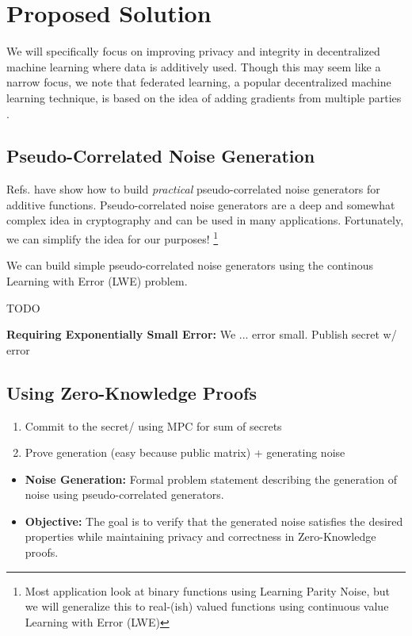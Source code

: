\documentclass[11pt]{article}
\begin{document}
\section{Proposed Solution}
We will specifically focus on improving privacy and integrity in decentralized machine learning where data is additively used.
Though this may seem like a narrow focus, we note that federated learning, a popular decentralized machine learning technique, is based on the idea of adding gradients from multiple parties .

\subsection{Pseudo-Correlated Noise Generation}
Refs. \cite{zhao2019secure, betterCRG} have show how to build \emph{practical} pseudo-correlated noise generators for additive functions.
Pseudo-correlated noise generators are a deep and somewhat complex idea in cryptography and can be used in many applications.
Fortunately, we can simplify the idea for our purposes!
\footnote{Most application look at binary functions using Learning Parity Noise, but we will generalize this to real-(ish) valued functions using continuous value Learning with Error (LWE)}

\begin{definition}
\end{definition}

We can build simple pseudo-correlated noise generators using the continous Learning with Error (LWE) problem.
\begin{itemize}
	TODO
\end{itemize}

\textbf{Requiring Exponentially Small Error:} We ... error small.
Publish secret w/ error

\subsection{Using Zero-Knowledge Proofs}
\begin{enumerate}
	\item Commit to the secret/ using MPC for sum of secrets
	\item Prove generation (easy because public matrix) + generating noise


\end{enumerate}


\begin{itemize}
	\item \textbf{Noise Generation:} Formal problem statement describing the generation of noise using pseudo-correlated generators.
	\item \textbf{Objective:} The goal is to verify that the generated noise satisfies the desired properties while maintaining privacy and correctness in Zero-Knowledge proofs.
\end{itemize}
\end{document}
